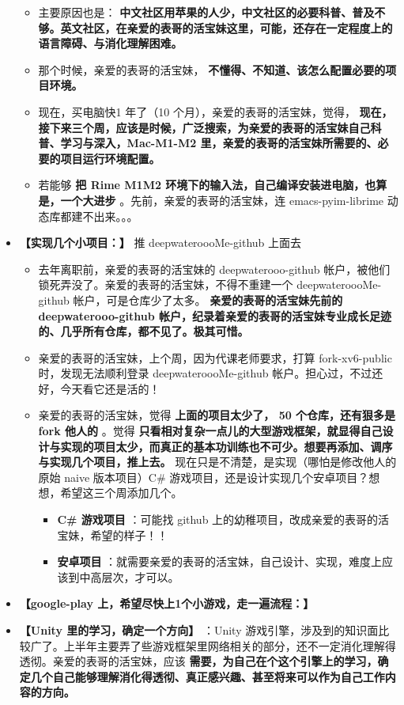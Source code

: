 \documentclass[9pt, b5paper]{article}
\begin{document}
\begin{itemize}
\begin{itemize}
\item 主要原因也是： \textbf{中文社区用苹果的人少，中文社区的必要科普、普及不够。英文社区，在亲爱的表哥的活宝妹这里，可能，还存在一定程度上的语言障碍、与消化理解困难。}
\item 那个时候，亲爱的表哥的活宝妹， \textbf{不懂得、不知道、该怎么配置必要的项目环境。}
\item 现在，买电脑快1 年了（10 个月），亲爱的表哥的活宝妹，觉得， \textbf{现在，接下来三个周，应该是时候，广泛搜索，为亲爱的表哥的活宝妹自己科普、学习与深入，Mac-M1-M2 里，亲爱的表哥的活宝妹所需要的、必要的项目运行环境配置。}
\item 若能够 \textbf{把 Rime M1M2 环境下的输入法，自己编译安装进电脑，也算是，一个大进步} 。先前，亲爱的表哥的活宝妹，连 emacs-pyim-librime 动态库都建不出来。。。
\end{itemize}
\item \textbf{【实现几个小项目：】} 推 deepwateroooMe-github 上面去
\begin{itemize}
\item 去年离职前，亲爱的表哥的活宝妹的 deepwaterooo-github 帐户，被他们锁死弄没了。亲爱的表哥的活宝妹，不得不重建一个 deepwateroooMe-github 帐户，可是仓库少了太多。 \textbf{亲爱的表哥的活宝妹先前的 deepwaterooo-github 帐户，纪录着亲爱的表哥的活宝妹专业成长足迹的、几乎所有仓库，都不见了。极其可惜。}
\item 亲爱的表哥的活宝妹，上个周，因为代课老师要求，打算 fork-xv6-public 时，发现无法顺利登录 deepwateroooMe-github 帐户。担心过，不过还好，今天看它还是活的！
\item 亲爱的表哥的活宝妹，觉得 \textbf{上面的项目太少了， 50 个仓库，还有狠多是 fork 他人的} 。觉得 \textbf{只看相对复杂一点儿的大型游戏框架，就显得自己设计与实现的项目太少，而真正的基本功训练也不可少。想要再添加、调序与实现几个项目，推上去。} 现在只是不清楚，是实现（哪怕是修改他人的原始 naive 版本项目）C\# 游戏项目，还是设计实现几个安卓项目？想想，希望这三个周添加几个。
\begin{itemize}
\item \textbf{C\# 游戏项目} ：可能找 github 上的幼稚项目，改成亲爱的表哥的活宝妹，希望的样子！！
\item \textbf{安卓项目} ：就需要亲爱的表哥的活宝妹，自己设计、实现，难度上应该到中高层次，才可以。
\end{itemize}
\end{itemize}
\item \textbf{【google-play 上，希望尽快上1个小游戏，走一遍流程：】}
\item \textbf{【Unity 里的学习，确定一个方向】} ：Unity 游戏引擎，涉及到的知识面比较广了。上半年主要弄了些游戏框架里网络相关的部分，还不一定消化理解得透彻。亲爱的表哥的活宝妹，应该 \textbf{需要，为自己在个这个引擎上的学习，确定几个自己能够理解消化得透彻、真正感兴趣、甚至将来可以作为自己工作内容的方向。}

\end{itemize}
\end{document}
